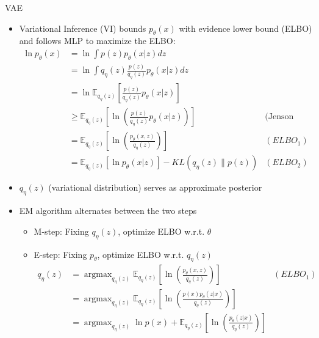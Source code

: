 \documentclass[compress]{beamer}
\newcommand{\expects}[2]{\mathbb{E}_{#1} \left[ #2 \right]}
\begin{document}
\begin{frame}[allowframebreaks]{VAE}
    \begin{itemize}
        \item Variational Inference (VI) bounds $p_{\theta}(x)$ with evidence lower bound (ELBO) and follows MLP to maximize the ELBO:
            \begin{align*}
                \ln p_{\theta}(x) & = \ln \int p(z)p_{\theta}(x|z) dz & \\
                                  & =  \ln \int q_{\eta}(z) \frac{p(z)}{q_{\eta}(z)} p_{\theta}(x|z) dz & \\
                                  & =  \ln \expects{q_{\eta}(z)}{ \frac{p(z)}{q_{\eta}(z)} p_{\theta}(x|z)}&  \\
                                  & \ge \expects{q_{\eta}(z)}{ \ln \left(  \frac{p(z)}{q_{\eta}(z)} p_{\theta}(x|z)\right) } & \text{(Jenson Inequality)}\\
                                  & = \expects{q_{\eta}(z)}{ \ln \left(  \frac{p_{\theta}(x,z)}{q_{\eta}(z)} \right) } & (ELBO_1)\\
                                  & = \expects{q_{\eta}(z)}{\ln p_{\theta}(x|z)} - KL(q_{\eta}(z)\|p(z)) & (ELBO_2)
            \end{align*}
    \end{itemize}
    \framebreak
    \begin{itemize}
        \item $q_{\eta}(z)$ (variational distribution) serves as approximate posterior
        \item EM algorithm alternates between the two steps
            \begin{itemize}
                \item M-step: Fixing $q_{\eta}(z)$, optimize ELBO w.r.t. $\theta$ \\
                \item E-step: Fixing $p_{\theta}$, optimize ELBO w.r.t. $q_{\eta}(z)$
                    \begin{align*}
                        q_{\eta}(z) &  = \mathop{argmax}_{q_\eta(z)}\expects{q_{\eta}(z)}{ \ln \left(  \frac{p_{\theta}(x,z)}{q_{\eta}(z)} \right) } & (ELBO_1)\\
                                    &  = \mathop{argmax}_{q_\eta(z)}\expects{q_{\eta}(z)}{ \ln \left(  \frac{p(x)p_{\theta}(z|x)}{q_{\eta}(z)} \right) } & \\
                                    &  = \mathop{argmax}_{q_\eta(z)} \ln p(x) + \expects{q_{\eta}(z)}{ \ln \left(  \frac{p_{\theta}(z|x)}{q_{\eta}(z)} \right) } & \\

\end{align*}
\end{itemize}
\end{itemize}
\end{frame}
\end{document}
